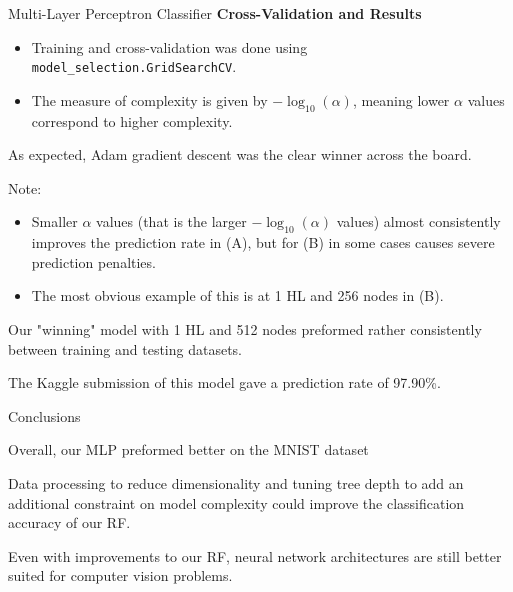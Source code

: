 \documentclass[titlepage,leqno]{beamer}%
\begin{document}
\begin{frame}[fragile]{Multi-Layer Perceptron Classifier}
\scriptsize
\textbf{Cross-Validation and Results}

\smallskip

\begin{itemize}
	\item Training and cross-validation was done using \verb+model_selection.GridSearchCV+.
	\item The measure of complexity is given by $-\log_{10}(\alpha)$, meaning lower $\alpha$ values
	correspond to higher complexity.
\end{itemize}
\medskip
As expected, Adam gradient descent was the clear winner across the board.

Note:
\begin{itemize}
	\item Smaller $\alpha$ values (that is the larger $-\log_{10}(\alpha)$ values) almost consistently
	improves the prediction rate in (A), but for (B) in some cases causes severe prediction penalties.
	\item The most obvious example of this is at 1 HL and 256 nodes in (B).
\end{itemize}
\medskip

Our "winning" model with 1 HL and 512 nodes preformed rather consistently between training and testing datasets.

\medskip
\begin{framed}
\centering
The Kaggle submission of this model gave a prediction rate of 97.90\%.
\end{framed}
\end{frame}
\begin{frame}{Conclusions}

Overall, our MLP preformed better on the MNIST dataset
\vspace{3.5mm}

Data processing to reduce dimensionality and tuning tree depth to add an additional constraint on model complexity could improve the classification accuracy of our RF. %
\vspace{3.5mm}

Even with improvements to our RF, neural network architectures are still better suited for computer vision problems. %

\end{frame}
\end{document}
